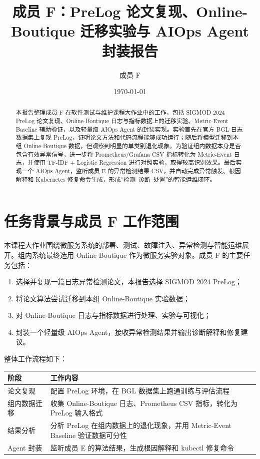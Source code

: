 \documentclass[UTF8,a4paper,12pt]{ctexart}
\title{成员 F：PreLog 论文复现、Online-Boutique 迁移实验与 AIOps Agent 封装报告}
\author{成员 F}
\date{\today}
\begin{document}
\maketitle

\begin{abstract}
本报告整理成员 F 在软件测试与维护课程大作业中的工作，包括 SIGMOD 2024 PreLog 论文复现、Online-Boutique 日志与指标数据上的迁移实验、Metric-Event Baseline 辅助验证，以及轻量级 AIOps Agent 的封装实现。实验首先在官方 BGL 日志数据集上复现 PreLog，证明论文方法和代码流程能够成功运行；随后将模型迁移到本组 Online-Boutique 数据，但观察到明显的单类别退化现象。为验证组内数据本身是否包含有效异常信号，进一步将 Prometheus/Grafana CSV 指标转化为 Metric-Event 日志，并使用 TF-IDF + Logistic Regression 进行对照实验，取得较高识别效果。最后实现一个 AIOps Agent，监听成员 E 的异常检测结果 CSV，并自动完成异常触发、根因解释和 Kubernetes 修复命令生成，形成“检测--诊断--处置”的智能运维闭环。
\end{abstract}

\tableofcontents
\newpage

\section{任务背景与成员 F 工作范围}

本课程大作业围绕微服务系统的部署、测试、故障注入、异常检测与智能运维展开。组内系统最终选用 Online-Boutique 作为微服务实验对象。成员 F 的主要任务包括：

\begin{enumerate}[label=\arabic*.]
    \item 选择并复现一篇日志异常检测论文，本报告选择 SIGMOD 2024 PreLog；
    \item 将论文算法尝试迁移到本组 Online-Boutique 实验数据；
    \item 对 Online-Boutique 日志与指标数据进行处理、实验与可视化；
    \item 封装一个轻量级 AIOps Agent，接收异常检测结果并输出诊断解释和修复建议。
\end{enumerate}

整体工作流程如下：

\begin{center}
\begin{tabular}{p{3cm}p{10cm}}
\toprule
阶段 & 工作内容 \\
\midrule
论文复现 & 配置 PreLog 环境，在 BGL 数据集上跑通训练与评估流程 \\
组内数据迁移 & 收集 Online-Boutique 日志、Prometheus CSV 指标，转化为 PreLog 输入格式 \\
结果分析 & 分析 PreLog 在组内数据上的退化现象，并用 Metric-Event Baseline 验证数据可分性 \\
Agent 封装 & 监听成员 E 的算法结果，生成根因解释和 kubectl 修复命令 \\
\bottomrule
\end{tabular}
\end{center}
\end{document}
